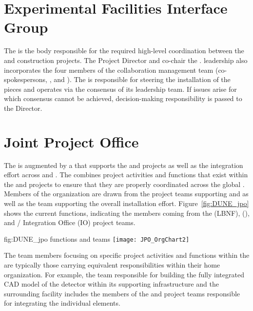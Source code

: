 \section{Experimental Facilities Interface Group}
\label{sec:efig}

The  is the body responsible for the required high-level
coordination between the  and  construction 
projects.  The  Project Director and  
co-chair the .   leadership also incorporates 
the four members of the  collaboration management 
team (co-spokespersons, , and ).  
The  is responsible for steering the  
installation of the  pieces and operates via the 
consensus of its leadership team.  If issues arise for which consensus 
cannot be achieved, decision-making responsibility is passed to the 
 Director.

\section{Joint Project Office}
\label{sec:jpo}

The  is augmented by a  that supports the
 and  projects as well as the integration
effort across  and . The  combines
project activities and functions that exist within the 
and  projects to ensure that they are properly coordinated
across the global .  Members of the 
organization are drawn from the project teams supporting
 and  as well as the team supporting the
overall installation effort.  Figure~\ref{fig:DUNE_jpo} shows the
current  functions, indicating the members coming
from the  (LBNF),  (), and
/ Integration Office (IO) project teams.
\begin{dunefigure}{fig:DUNE_jpo}
  { functions and teams}
  \texttt{[image: JPO\_OrgChart2]}
\end{dunefigure}
The team members focusing on specific project activities and 
functions within the  are typically those carrying 
equivalent responsibilities within their home organization.  For 
example, the  team responsible for building the fully 
integrated \threed CAD model of the detector within its supporting 
infrastructure and the surrounding facility includes the members 
of the  and  project teams responsible 
for integrating the individual elements.

